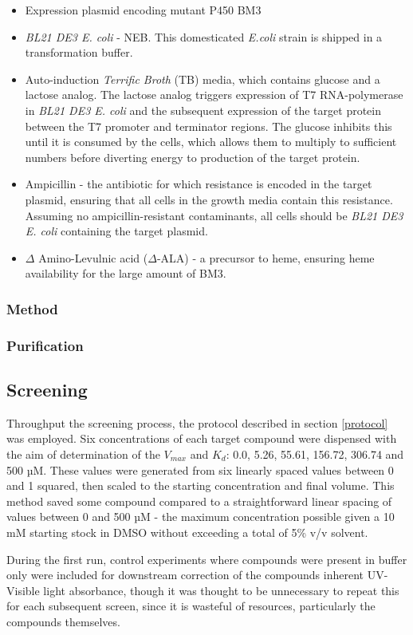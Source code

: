 \documentclass[16pt]{book}
\begin{document}
\begin{itemize}
	\item Expression plasmid encoding mutant P450 BM3
	\item \textit{BL21 DE3 E. coli} - NEB. This domesticated \textit{E.coli} strain is shipped in a transformation buffer.
	\item Auto-induction \textit{Terrific Broth} (TB) media, which contains glucose and a lactose analog. 
	The lactose analog triggers expression of T7 RNA-polymerase in \textit{BL21 DE3 E. coli} and the subsequent expression of the target protein between the T7 promoter and terminator regions. 
	The glucose inhibits this until it is consumed by the cells, which allows them to multiply to sufficient numbers before diverting energy to production of the target protein.
	\item Ampicillin - the antibiotic for which resistance is encoded in the target plasmid, ensuring that all cells in the growth media contain this resistance.
	Assuming no ampicillin-resistant contaminants, all cells should be \textit{BL21 DE3 E. coli} containing the target plasmid.
	\item $\Delta$ Amino-Levulnic acid ($\Delta$-ALA) - a precursor to heme, ensuring heme availability for the large amount of BM3.
\end{itemize}

\subsubsection{Method}

\subsubsection{Purification}

\subsection{Screening}

Throughput the screening process, the protocol described in section \ref{protocol} was employed.
Six concentrations of each target compound were dispensed with the aim of determination of the $V_{max}$ and $K_d$: 0.0, 5.26, 55.61, 156.72, 306.74 and 500 µM.
These values were generated from six linearly spaced values between 0 and 1 squared, then scaled to the starting concentration and final volume.
This method saved some compound compared to a straightforward linear spacing of values between 0 and 500 µM - the maximum concentration possible given a 10 mM starting stock in DMSO without exceeding a total of 5\% v/v solvent.
\par
During the first run, control experiments where compounds were present in buffer only were included for downstream correction of the compounds inherent UV-Visible light absorbance, though it was thought to be unnecessary to repeat this for each subsequent screen, since it is wasteful of resources, particularly the compounds themselves.
\end{document}
